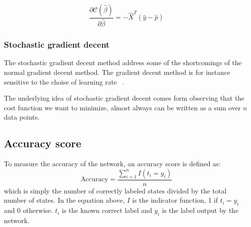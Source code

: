 \begin{equation}\label{eq:delta-c}
	\frac{\partial \mathcal{C}(\hat{\beta})}{\partial \hat{\beta}} = -\hat{X}^T\left(\hat{y}-\hat{p}\right)
\end{equation}

\subsubsection{Stochastic gradient decent} 
The stochastic gradient decent method address some of the shortcomings 
of the normal gradient decent method. The gradient decent method is 
for instance sensitive to the choise of learning rate ~\cite{LectureNotes-FysStk}.

The underlying idea of stochastic gradient decent comes form observing
that the cost function we want to minimize, almost always can be written as 
a sum over \(n\) data points. ~\cite{LectureNotes-FysStk} 

\subsection{Accuracy score}\label{seq:accuracy} 
To measure the accuracy of the network, an accuracy score is defined as:
\begin{equation*}
	\text{Accuracy} = \frac{\sum_{i=1}^{n} I(t_i = y_i)}{n}
\end{equation*}
which is simply the number of correctly labeled states divided by the
total number of states. In the equation above, $I$ is the indicator function,
1 if $t_i = y_i$ and 0 otherwise. $t_i$ is the known correct label and $y_i$ is the
label output by the network.






